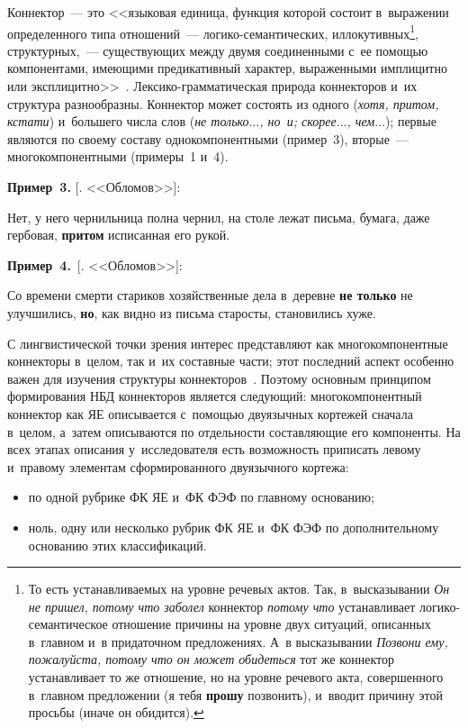 \begin{multicols}{2}
Коннектор~--- это <<языковая единица, функция которой состоит 
в~выражении определенного типа 
отношений~---  
ло\-ги\-ко-се\-ман\-ти\-че\-ских, иллокутивных\footnote{То есть устанавливаемых 
на уровне речевых 
актов. Так, в~высказывании \textit{Он не пришел, потому что заболел} коннектор \textit{потому 
что} устанавливает ло\-ги\-ко-се\-ман\-ти\-че\-ское отношение причины 
на уровне двух ситуаций, 
описанных в~главном и~в придаточном предложениях. 
А~в высказывании \textit{Позвони ему, 
пожалуйста, потому что он может обидеться} тот же коннектор устанавливает то же 
отношение, но на уровне речевого акта, совершенного в~главном предложении (я тебя 
\textbf{прошу} позвонить), и~вводит причину этой просьбы (иначе он обидится).}, 
структурных,~--- 
существующих между двумя соединенными с~ее помощью компонентами, имеющими предикативный 
характер, выраженными имплицитно или эксплицитно>>~\cite{17-zat}.  
Лек\-си\-ко-грам\-ма\-ти\-че\-ская природа коннекторов и~их структура разнообразны. 
Коннектор может 
состоять из одного (\textit{хотя, притом, кстати}) и~большего числа слов 
(\textit{не только$\ldots$, но~и; 
скорее$\ldots$, чем}$\ldots$); первые являются по своему составу 
однокомпонентными (пример~3),  вторые~--- многокомпонентными (примеры~1 и~4). 

\smallskip

  \noindent
  \textbf{Пример~3.} [. <<Обломов>>]:
  
  Нет, у него чернильница полна чернил, на столе лежат письма, бумага, даже гербовая, 
\textbf{притом} исписанная его рукой.
  
  \smallskip
  
  \noindent
  \textbf{Пример~4.}\ [. <<Обломов>>]: 
  
  Со времени смерти стариков хозяйственные дела в~деревне \textbf{не только} не 
улучшились, \textbf{но}, как видно из письма старосты, становились хуже.
  
  С лингвистической точки зрения интерес представляют как 
многокомпонентные коннекторы в~целом, так и~их составные части; этот 
последний аспект особенно важен для изучения структуры 
коннекторов~\cite{18-zat}. Поэтому основным принципом формирования 
НБД коннекторов является сле\-ду\-ющий: многокомпонентный коннектор как 
ЯЕ описывается с~по\-мощью двуязычных кортежей сначала 
в~целом, а~затем описываются по от\-дель\-ности составляющие его 
компоненты. На всех этапах описания у~исследователя есть возможность 
приписать левому и~правому элементам сформированного двуязычного 
кортежа:
  \begin{itemize}
\item по одной рубрике ФК ЯЕ и~ФК ФЭФ по главному основанию;
\item ноль, одну или несколько рубрик ФК ЯЕ и~ФК ФЭФ по 
дополнительному основанию этих классификаций.
\end{itemize}


\end{multicols}
